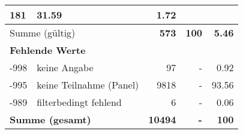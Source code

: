 \begin{longtable}{lXrrr}
       \num{181} &
       \num[round-mode=places,round-precision=2]{31.59} &
         \num[round-mode=places,round-precision=2]{1.72} \\
     \midrule
     \multicolumn{2}{l}{Summe (gültig)} &
       \textbf{\num{573}} &
     \textbf{\num{100}} &
       \textbf{\num[round-mode=places,round-precision=2]{5.46}} \\
     \multicolumn{5}{l}{\textbf{Fehlende Werte}}\\
       -998 &
       keine Angabe &
         \num{97} &
        - &
         \num[round-mode=places,round-precision=2]{0.92} \\
       -995 &
       keine Teilnahme (Panel) &
         \num{9818} &
        - &
         \num[round-mode=places,round-precision=2]{93.56} \\
       -989 &
       filterbedingt fehlend &
         \num{6} &
        - &
         \num[round-mode=places,round-precision=2]{0.06} \\
     \midrule
     \multicolumn{2}{l}{\textbf{Summe (gesamt)}} &
          \textbf{\num{10494}} &
        \textbf{-} &
        \textbf{\num{100}} \\
     \bottomrule
     \end{longtable}
     
